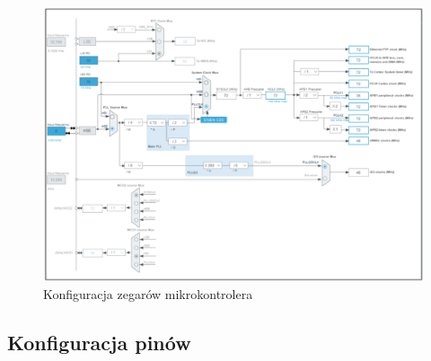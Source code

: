 \documentclass[10pt, a4paper]{article}
\begin{document}
\newpage
\begin{figure}[H]
	\centering
	\includegraphics[width=0.9\textheight,angle=90]{nowe_zegary.PNG}
	\caption{Konfiguracja zegarów mikrokontrolera}
	\label{fig:KonfiguracjaZegara}
\end{figure}

\subsection{Konfiguracja pinów}
\end{document}

